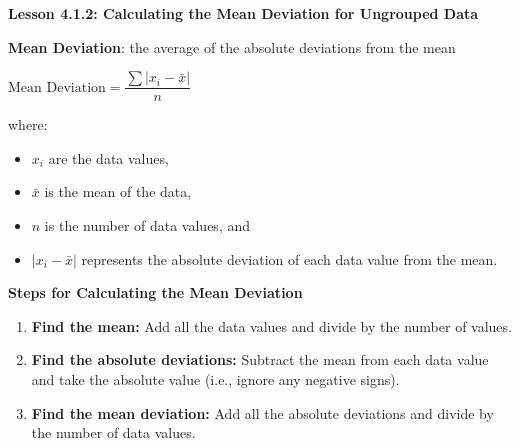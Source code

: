  \begin{center}
\textbf{Lesson 4.1.2: Calculating the Mean Deviation for Ungrouped Data}
\end{center}

\vspace*{1ex}

\noindent\textbf{Mean Deviation}: the average of the absolute deviations from the mean

{\centering $ \text{Mean Deviation} = \dfrac{\sum |x_i - \bar{x}|}{n} $\par}
where:
\begin{itemize}
    \item $x_i$ are the data values,
    \item $\bar{x}$ is the mean of the data,
    \item $n$ is the number of data values, and
    \item $|x_i - \bar{x}|$ represents the absolute deviation of each data value from the mean.
\end{itemize}

\noindent\textbf{Steps for Calculating the Mean Deviation}

\begin{enumerate}
    \item \textbf{Find the mean:} Add all the data values and divide by the number of values.
    \item \textbf{Find the absolute deviations:} Subtract the mean from each data value and take the absolute value (i.e., ignore any negative signs).
    \item \textbf{Find the mean deviation:} Add all the absolute deviations and divide by the number of data values.
\end{enumerate}



